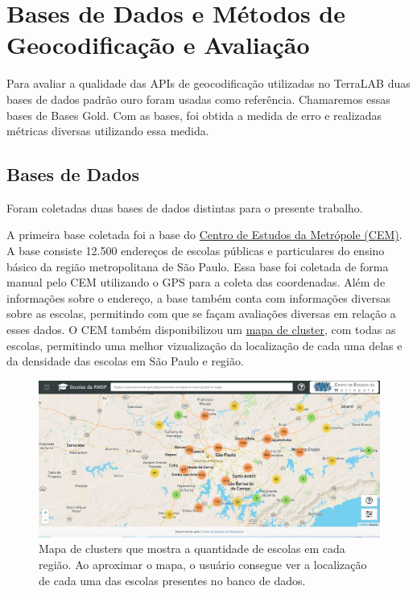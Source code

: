 \chapter{Bases de Dados e Métodos de Geocodificação e Avaliação} \label{desenvolvimento}


Para avaliar a qualidade das APIs de geocodificação utilizadas no TerraLAB duas bases de dados padrão ouro foram usadas como referência. Chamaremos essas bases de Bases Gold. Com as bases, foi obtida a medida de erro e realizadas métricas diversas utilizando essa medida.


\section{Bases de Dados}
Foram coletadas duas bases de dados distintas para o presente trabalho.

A primeira base coletada foi a base do \href{https://centrodametropole.fflch.usp.br/pt-br}{Centro de Estudos da Metrópole (CEM)}. A base consiste 12.500 endereços de escolas públicas e particulares do ensino básico da região metropolitana de São Paulo. Essa base foi coletada de forma manual pelo CEM utilizando o GPS para a coleta das coordenadas. Além de informações sobre o endereço, a base também conta com informações diversas sobre as escolas, permitindo com que se façam avaliações diversas em relação a esses dados. O CEM também disponibilizou um \href{http://200.144.244.241:3002/geolocation}{mapa de cluster}, com todas as escolas, permitindo uma melhor vizualização da localização de cada uma delas e da densidade das escolas em São Paulo e região.

\begin{figure}
    \centering
    \includegraphics[width=\textwidth]{Figuras/siteCEM.jpeg}
    \caption{Mapa de clusters que mostra a quantidade de escolas em cada região. Ao aproximar o mapa, o usuário consegue ver a localização de cada uma das escolas presentes no banco de dados.}
    \label{fig:siteCEM}
\end{figure}

